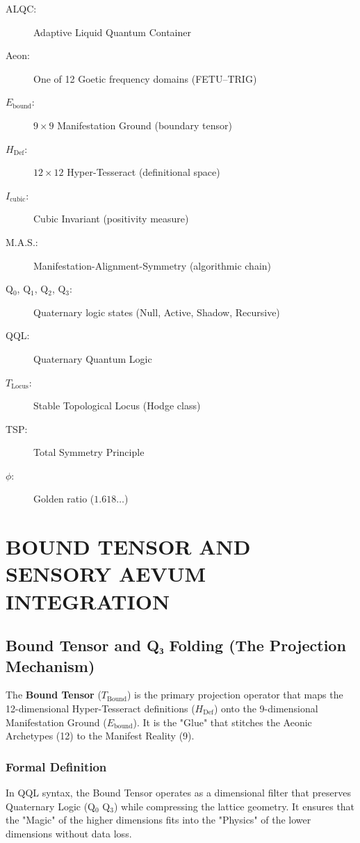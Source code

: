 \documentclass[11pt, letterpaper]{article}
\newcommand{\FETU}{\ensuremath{\mathop{\textnormal{\thaanafont\symbol{"23E3}}}}}   %
\newcommand{\TRIG}{\ensuremath{\mathop{\textnormal{\tifinaghfont\symbol{"2D63}}}}}    %
\def\FETU{FETU}%
\def\TRIG{TRIG}%
\begin{document}
\begin{description}
    \item[ALQC:] Adaptive Liquid Quantum Container
    \item[Aeon:] One of 12 Goetic frequency domains (\FETU--\TRIG)
    \item[$E_{\text{bound}}$:] $9 \times 9$ Manifestation Ground (boundary tensor)
    \item[$H_{\text{Def}}$:] $12 \times 12$ Hyper-Tesseract (definitional space)
    \item[$I_{\text{cubic}}$:] Cubic Invariant (positivity measure)
    \item[M.A.S.:] Manifestation-Alignment-Symmetry (algorithmic chain)
    \item[Q$_0$, Q$_1$, Q$_2$, Q$_3$:] Quaternary logic states (Null, Active, Shadow, Recursive)
    \item[QQL:] Quaternary Quantum Logic
    \item[$T_{\text{Locus}}$:] Stable Topological Locus (Hodge class)
    \item[TSP:] Total Symmetry Principle
    \item[$\phi$:] Golden ratio ($1.618\dots$)
\end{description}

\section{BOUND TENSOR AND SENSORY AEVUM INTEGRATION}\label{appendixE}


\subsection{Bound Tensor and Q₃ Folding (The Projection Mechanism)}\label{appendixE.1}

The \textbf{Bound Tensor} ($T_{\text{Bound}}$) is the primary projection operator that maps the 12-dimensional Hyper-Tesseract definitions ($H_{\text{Def}}$) onto the 9-dimensional Manifestation Ground ($E_{\text{bound}}$). It is the "Glue" that stitches the Aeonic Archetypes (12) to the Manifest Reality (9).

\subsubsection*{Formal Definition}\label{appendixE.1.1}
In QQL syntax, the Bound Tensor operates as a dimensional filter that preserves Quaternary Logic (Q$_0$ \to Q$_3$) while compressing the lattice geometry. It ensures that the "Magic" of the higher dimensions fits into the "Physics" of the lower dimensions without data loss.
\end{document}
